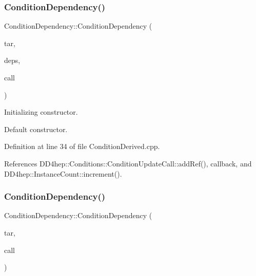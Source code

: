 \subsubsection{\texorpdfstring{Condition\+Dependency()}{ConditionDependency()}\hspace{0.1cm}{\footnotesize\ttfamily [2/4]}}
{\footnotesize\ttfamily Condition\+Dependency\+::\+Condition\+Dependency (\begin{DoxyParamCaption}\item[{const \hyperlink{class_d_d4hep_1_1_conditions_1_1_condition_key}{Condition\+Key} \&}]{tar,  }\item[{const \hyperlink{class_d_d4hep_1_1_conditions_1_1_condition_dependency_af1594501f40e514c5748092b94e4fd84}{Dependencies}}]{deps,  }\item[{\hyperlink{class_d_d4hep_1_1_conditions_1_1_condition_update_call}{Condition\+Update\+Call} $\ast$}]{call }\end{DoxyParamCaption})}



Initializing constructor. 

Default constructor. 

Definition at line 34 of file Condition\+Derived.\+cpp.



References D\+D4hep\+::\+Conditions\+::\+Condition\+Update\+Call\+::add\+Ref(), callback, and D\+D4hep\+::\+Instance\+Count\+::increment().

\hypertarget{class_d_d4hep_1_1_conditions_1_1_condition_dependency_aa3f6e8cb34ed2a24a07d6648668bf594}{}\label{class_d_d4hep_1_1_conditions_1_1_condition_dependency_aa3f6e8cb34ed2a24a07d6648668bf594} 
\subsubsection{\texorpdfstring{Condition\+Dependency()}{ConditionDependency()}\hspace{0.1cm}{\footnotesize\ttfamily [3/4]}}
{\footnotesize\ttfamily Condition\+Dependency\+::\+Condition\+Dependency (\begin{DoxyParamCaption}\item[{const \hyperlink{class_d_d4hep_1_1_conditions_1_1_condition_key}{Condition\+Key} \&}]{tar,  }\item[{\hyperlink{class_d_d4hep_1_1_conditions_1_1_condition_update_call}{Condition\+Update\+Call} $\ast$}]{call }\end{DoxyParamCaption})}



